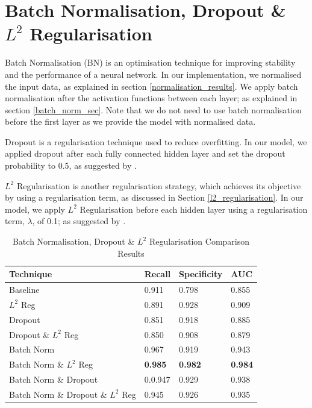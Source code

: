     \section{Batch Normalisation, Dropout \& $L^2$ Regularisation} \label{BN_l2_drop_results}
        Batch Normalisation (BN) is an optimisation technique for improving stability and the performance of a neural network. In our implementation, we normalised the input data, as explained in section \ref{normalisation_results}. We apply batch normalisation after the activation functions between each layer; as explained in section \ref{batch_norm_sec}. Note that we do not need to use batch normalisation before the first layer as we provide the model with normalised data. 
        
        Dropout is a regularisation technique used to reduce overfitting. In our model, we applied dropout after each fully connected hidden layer and set the dropout probability to 0.5, as suggested by \cite{dropout_hinton}.
        
        $L^2$ Regularisation is another regularisation strategy, which achieves its objective by using a regularisation term, as discussed in Section \ref{l2_regularisation}. In our model, we apply $L^2$ Regularisation before each hidden layer using a regularisation term, $\lambda$, of 0.1; as suggested by \cite{l2_value}.  
        
        \begin{table}[H]
            \centering
            \caption{Batch Normalisation, Dropout \& $L^2$ Regularisation Comparison Results} \vspace{0.5cm}
            \label{5: table_overfitting_bn_dropout}
                \begin{tabular}{|p{6.5cm}|p{2.5cm}|p{2.5cm}|p{2.5cm}|}
                    \hline \textbf{Technique} & \textbf{Recall} & \textbf{Specificity} & \textbf{AUC} \\ \hline \hline
                    Baseline &0.911 & 0.798 & 0.855 \\ \hline
                    $L^2$ Reg & 0.891 & 0.928 & 0.909 \\ \hline
                    Dropout & 0.851 & 0.918 & 0.885 \\ \hline
                    Dropout \& $L^2$ Reg  & 0.850 & 0.908 & 0.879 \\ \hline
                    Batch Norm & 0.967 & 0.919 & 0.943 \\ \hline
                    Batch Norm \& $L^2$ Reg  & \textbf{0.985} & \textbf{0.982}  & \textbf{0.984} \\ \hline
                    Batch Norm \& Dropout & 0.0.947 & 0.929 & 0.938 \\ \hline
                    Batch Norm \& Dropout \& $L^2$ Reg  & 0.945 & 0.926 & 0.935 \\ \hline
                \end{tabular}
        \end{table}
        
